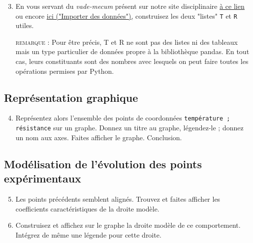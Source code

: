 \documentclass[11pt]{article}
\begin{document}
\begin{enumerate}
\setcounter{enumi}{2}
\item En vous servant du \emph{vade-mecum} présent sur notre site disciplinaire \href{http://pedagogie.ac-limoges.fr/physique-chimie/IMG/pdf/python-inportation\_de\_donnees.pdf}{\underline{à ce lien}} ou encore \href{https://padlet.com/laurent\_astier/formation\_Juin\_2019}{\underline{ici ("Importer des données")}}, construisez les deux "listes" \texttt{T} et \texttt{R} utiles.

\smallskip
\textsc{remarque : } Pour être précis, T et R ne sont pas des listes ni des tableaux mais un type particulier de données propre à la bibliothèque pandas. En tout cas, leurs constituants sont des nombres avec lesquels on peut faire toutes les opérations permises par Python.


\end{enumerate}




\subsection{Représentation graphique}
\begin{enumerate}
 \setcounter{enumi}{3}
 \item Représentez alors l'ensemble des points de coordonnées  \texttt{température ; résistance} sur un graphe. Donnez un titre au graphe, légendez-le ; donnez un nom aux axes. Faites afficher le graphe. Conclusion.
\end{enumerate}




\subsection{Modélisation de l'évolution des points expérimentaux}

\begin{enumerate}
 \setcounter{enumi}{4}
 \item Les points précédents semblent alignés. Trouvez et faites afficher les coefficients caractéristiques de la droite modèle. 
 \item Construisez et affichez sur le graphe la droite modèle de ce comportement. Intégrez de même une légende pour cette droite.
 \end{enumerate}








\bigskip
\end{document}

